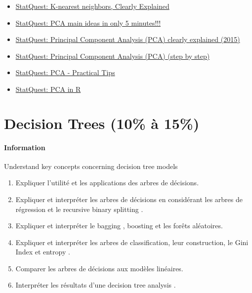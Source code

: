 \documentclass[12pt, titlepage, french]{report}
\begin{document}
\begin{YTB_vids}
\begin{itemize}
	\item	\href{https://www.youtube.com/watch?v=HVXime0nQeI&list=PLblh5JKOoLUICTaGLRoHQDuF_7q2GfuJF&index=33}{StatQuest: K-nearest neighbors, Clearly Explained}
	\item	\href{https://www.youtube.com/watch?v=HMOI_lkzW08&list=PLblh5JKOoLUICTaGLRoHQDuF_7q2GfuJF&index=23}{StatQuest: PCA main ideas in only 5 minutes!!!}
	\item	\href{https://www.youtube.com/watch?v=_UVHneBUBW0&t=16s}{StatQuest: Principal Component Analysis (PCA) clearly explained (2015)}
	\item	\href{https://www.youtube.com/watch?v=FgakZw6K1QQ}{StatQuest: Principal Component Analysis (PCA) (step by step)}
	\item	\href{https://www.youtube.com/watch?v=oRvgq966yZg&list=PLblh5JKOoLUICTaGLRoHQDuF_7q2GfuJF&index=24}{StatQuest: PCA - Practical Tips}
	\item	\href{https://www.youtube.com/watch?v=0Jp4gsfOLMs}{StatQuest: PCA in R}
\end{itemize}
\end{YTB_vids}


\newpage
\chapter[Decision Trees]{Decision Trees (10\% à 15\%)}

\subsubsection{Information}

\begin{distributions}[Objective]
Understand key concepts concerning decision tree models
\end{distributions}

\begin{outcomes}
\begin{enumerate}
	\item	Expliquer l'utilité et les applications des arbres de décisions.
	\item	Expliquer et interpréter les arbres de décisions en considérant les arbres de régression et le \og recursive binary splitting \fg{}.
	\item	Expliquer et interpréter le \og bagging \fg{}, \og boosting \fg{} et les forêts aléatoires.
	\item	Expliquer et interpréter les arbres de classification, leur construction, le \og Gini Index \fg{} et \og entropy \fg{}.
	\item	Comparer les arbres de décisions aux modèles linéaires.
	\item	Interpréter les résultats d'une \og decision tree analysis \fg{}.
\end{enumerate}
\end{outcomes}
\end{document}
